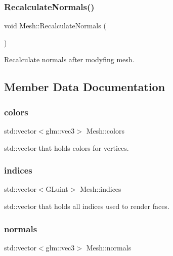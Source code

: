 \mbox{\label{class_mesh_a2688a608e0185faef28105fae57ad76d}} 
\subsubsection{\texorpdfstring{RecalculateNormals()}{RecalculateNormals()}}
{\footnotesize\ttfamily void Mesh\+::\+Recalculate\+Normals (\begin{DoxyParamCaption}{ }\end{DoxyParamCaption})}



Recalculate normals after modyfing mesh. 



\subsection{Member Data Documentation}
\mbox{\label{class_mesh_a484b6f05575dbac43b3f5de817f90069}} 
\subsubsection{\texorpdfstring{colors}{colors}}
{\footnotesize\ttfamily std\+::vector$<$glm\+::vec3$>$ Mesh\+::colors}



std\+::vector that holds colors for vertices. 

\mbox{\label{class_mesh_a5e55b84c6c967608bcf23ed7d68e4215}} 
\subsubsection{\texorpdfstring{indices}{indices}}
{\footnotesize\ttfamily std\+::vector$<$G\+Luint$>$ Mesh\+::indices}



std\+::vector that holds all indices used to render faces. 

\mbox{\label{class_mesh_a51622ff35f286e2015954aad76ee4bc2}} 
\subsubsection{\texorpdfstring{normals}{normals}}
{\footnotesize\ttfamily std\+::vector$<$glm\+::vec3$>$ Mesh\+::normals}



